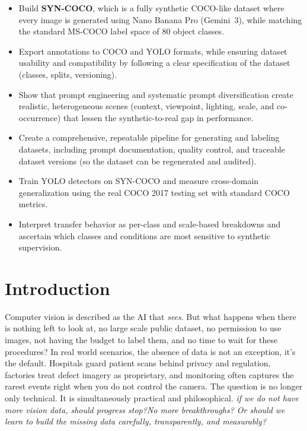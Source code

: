 \documentclass[conference]{IEEEtran}
\begin{document}
\begin{itemize}
    \item Build \textbf{SYN-COCO}, which is a fully synthetic COCO-like dataset where every image is generated using Nano Banana Pro (Gemini~3), while matching the standard MS-COCO label space of 80 object classes.
    \item Export annotations to COCO and YOLO formats, while ensuring dataset usability and compatibility by following a clear specification of the dataset (classes, splits, versioning).
    \item Show that prompt engineering and systematic prompt diversification create realistic, heterogeneous scenes (context, viewpoint, lighting, scale, and co-occurrence) that lessen the synthetic-to-real gap in performance.
    \item Create a comprehensive, repeatable pipeline for generating and labeling datasets, including prompt documentation, quality control, and traceable dataset versions (so the dataset can be regenerated and audited).
    \item Train YOLO detectors on SYN-COCO and measure cross-domain generalization using the real COCO 2017 testing set with standard COCO metrics.
    \item Interpret transfer behavior as per-class and scale-based breakdowns and ascertain which classes and conditions are most sensitive to synthetic supervision.
\end{itemize}
\section{Introduction}
Computer vision is described as the AI that \emph{sees}. But what happens when there is nothing left to look at, no large scale public dataset, no permission to use images, not having the budget to label them, and no time to wait for these procedures? In real world scenarios, the absence of data is not an exception, it's the default. Hospitals guard patient scans behind privacy and regulation, factories treat defect imagery as proprietary, and monitoring often captures the rarest events right when you do not control the camera. The question is no longer only technical. It is simultaneously practical and philosophical.  \emph{if we do not have more vision data, should progress stop?No more breakthroughs? Or should we learn to build the missing data carefully, transparently, and measurably?}\\
\end{document}
